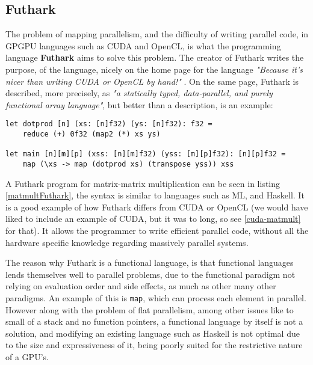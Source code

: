 \subsection{Futhark}
The problem of mapping parallelism, and the difficulty of writing parallel code, in GPGPU languages such as CUDA and OpenCL, is what the programming language \textbf{Futhark} aims to solve this problem. The creator of Futhark writes the purpose, of the language, nicely on the home page for the language \textit{"Because it’s nicer than writing CUDA or OpenCL by hand!"} \cite{futhark-home}. On the same page, Futhark is described, more precisely, as \textit{"a statically typed, data-parallel, and purely functional array language"}, but better than a description, is an example:
\begin{center}
\lstset{language=haskell}
\begin{lstlisting}
let dotprod [n] (xs: [n]f32) (ys: [n]f32): f32 =
	reduce (+) 0f32 (map2 (*) xs ys)

let main [n][m][p] (xss: [n][m]f32) (yss: [m][p]f32): [n][p]f32 =
	map (\xs -> map (dotprod xs) (transpose yss)) xss
\end{lstlisting}%
\label{matmultFuthark}
\end{center}
A Futhark program for matrix-matrix multiplication can be seen in listing \ref{matmultFuthark}, the syntax is similar to languages such as ML, and Haskell. It is a good example of how Futhark differs from CUDA or OpenCL (we would have liked to include an example of CUDA, but it was to long, so see \ref{cuda-matmult} for that). It allows the programmer to write efficient parallel code, without all the hardware specific knowledge regarding massively parallel systems. 

The reason why Futhark is a functional language, is that functional languages lends themselves well to parallel problems, due to the functional paradigm not relying on evaluation order and side effects, as much as other many other paradigms. An example of this is \texttt{map}, which can process each element in parallel. However along with the problem of flat parallelism, among other issues like to small of a stack and no function pointers, a functional language by itself is not a solution, and modifying an existing language such as Haskell is not optimal due to the size and expressiveness of it, being poorly suited for the restrictive nature of a GPU's. 

